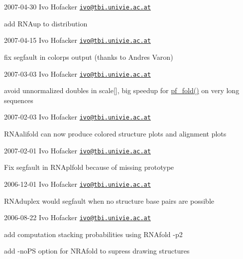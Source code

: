 2007-\/04-\/30 Ivo Hofacker \href{mailto:ivo@tbi.univie.ac.at}{\tt ivo@tbi.\+univie.\+ac.\+at}
\begin{DoxyItemize}
\item add R\+N\+Aup to distribution
\end{DoxyItemize}

2007-\/04-\/15 Ivo Hofacker \href{mailto:ivo@tbi.univie.ac.at}{\tt ivo@tbi.\+univie.\+ac.\+at}
\begin{DoxyItemize}
\item fix segfault in colorps output (thanks to Andres Varon)
\end{DoxyItemize}

2007-\/03-\/03 Ivo Hofacker \href{mailto:ivo@tbi.univie.ac.at}{\tt ivo@tbi.\+univie.\+ac.\+at}
\begin{DoxyItemize}
\item avoid unnormalized doubles in scale\mbox{[}\mbox{]}, big speedup for \mbox{\hyperlink{group__pf__fold_gadc3db3d98742427e7001a7fd36ef28c2}{pf\+\_\+fold()}} on very long sequences
\end{DoxyItemize}

2007-\/02-\/03 Ivo Hofacker \href{mailto:ivo@tbi.univie.ac.at}{\tt ivo@tbi.\+univie.\+ac.\+at}


\begin{DoxyItemize}
\item R\+N\+Aalifold can now produce colored structure plots and alignment plots
\end{DoxyItemize}

2007-\/02-\/01 Ivo Hofacker \href{mailto:ivo@tbi.univie.ac.at}{\tt ivo@tbi.\+univie.\+ac.\+at}


\begin{DoxyItemize}
\item Fix segfault in R\+N\+Aplfold because of missing prototype
\end{DoxyItemize}

2006-\/12-\/01 Ivo Hofacker \href{mailto:ivo@tbi.univie.ac.at}{\tt ivo@tbi.\+univie.\+ac.\+at}


\begin{DoxyItemize}
\item R\+N\+Aduplex would segfault when no structure base pairs are possible
\end{DoxyItemize}

2006-\/08-\/22 Ivo Hofacker \href{mailto:ivo@tbi.univie.ac.at}{\tt ivo@tbi.\+univie.\+ac.\+at}


\begin{DoxyItemize}
\item add computation stacking probabilities using R\+N\+Afold -\/p2
\item add -\/no\+PS option for N\+R\+Afold to supress drawing structures
\end{DoxyItemize}

